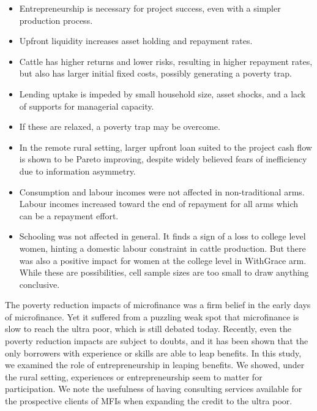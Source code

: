 \begin{mdframed}[style={SecItemize}, frametitle={Conclusion}]
\begin{itemize}
\vspace{1.0ex}\setlength{\itemsep}{1.0ex}\setlength{\baselineskip}{12pt}
\item	Entrepreneurship is necessary for project success, even with a simpler production process.
\item	Upfront liquidity increases asset holding and repayment rates.
\item	Cattle has higher returns and lower risks, resulting in higher repayment rates, but also has larger initial fixed costs, possibly generating a poverty trap.
\item	Lending uptake is impeded by small household size, asset shocks, and a lack of supports for managerial capacity.
\item	If these are relaxed, a poverty trap may be overcome.
\item	In the remote rural setting, larger upfront loan suited to the project cash flow is shown to be Pareto improving, despite widely believed fears of inefficiency due to information asymmetry.
\item	Consumption and labour incomes were not affected in non-\textsf{traditional} arms. Labour incomes increased toward the end of repayment for all arms which can be a repayment effort.
\item	Schooling was not affected in general. It finds a sign of a loss to college level women, hinting a domestic labour constraint in cattle production. But there was also a positive impact for women at the college level in \textsf{WithGrace} arm. While these are possibilities, cell sample sizes are too small to draw anything conclusive.
\end{itemize}
\end{mdframed}

	The poverty reduction impacts of microfinance was a firm belief in the early days of microfinance. Yet it suffered from a puzzling weak spot that microfinance is slow to reach the ultra poor, which is still debated today. Recently, even the poverty reduction impacts are subject to doubts, and it has been shown that the only borrowers with experience or skills are able to leap benefits. In this study, we examined the role of entrepreneurship in leaping benefits. We showed, under the rural setting, experiences or entrepreneurship seem to matter for participation. We note the usefulness of having consulting services available for the prospective clients of MFIs when expanding the credit to the ultra poor. 

